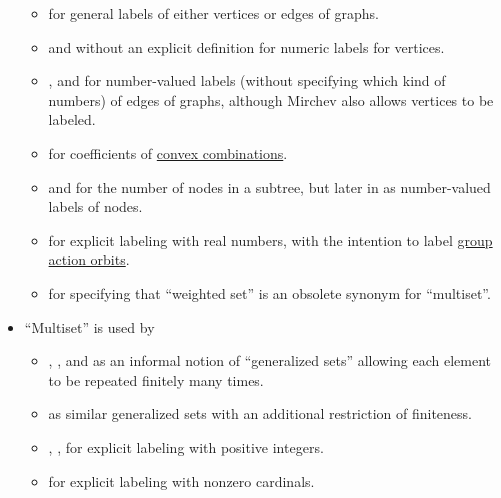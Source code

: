 \begin{remark}
\begin{itemize}
\begin{itemize}
      \item {} for general labels of either vertices or edges of graphs.

      \item {} and  without an explicit definition for numeric labels for vertices.

      \item {},  and  for number-valued labels (without specifying which kind of numbers) of edges of graphs, although Mirchev also allows vertices to be labeled.

      \item {} for coefficients of \hyperref[def:convex_hull]{convex combinations}.

      \item {} and  for the number of nodes in a subtree, but later in  as number-valued labels of nodes.

      \item {} for explicit labeling with real numbers, with the intention to label \hyperref[def:group_action_orbit]{group action orbits}.

      \item {} for specifying that \enquote{weighted set} is an obsolete synonym for \enquote{multiset}.
    \end{itemize}

    \item \enquote{Multiset} is used by
    \begin{itemize}
      \item {}, ,  and  as an informal notion of \enquote{generalized sets} allowing each element to be repeated finitely many times.

      \item {} as similar generalized sets with an additional restriction of finiteness.

      \item {}, ,   for explicit labeling with positive integers.

      \item {} for explicit labeling with nonzero cardinals.
    \end{itemize}
  \end{itemize}
\end{remark}

